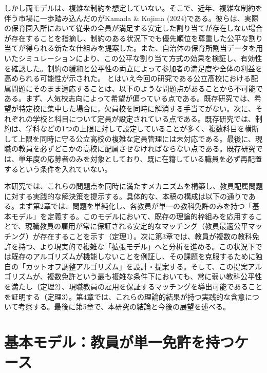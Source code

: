 \documentclass[12pt, a4paper]{article}
\theoremstyle{definition}
\theoremstyle{remark}
\theoremstyle{plain}
\begin{document}
しかし両モデルは、複雑な制約を想定していない。そこで、近年、複雑な制約を伴う市場に一歩踏み込んだのがKamada $\&$ Kojima (2024)である。彼らは、実際の保育園入所において従来の全員が満足する安定した割り当てが存在しない場合が存在することを指摘し、制約のある状況下でも優先順位を尊重した公平な割り当てが得られる新たな仕組みを提案した。また、自治体の保育所割当データを用いたシミュレーションにより、この公平な割り当て方式の効果を検証し、有効性を確認した。制約の緩和と公平性の両立によって参加者の満足度や全体の利益を高められる可能性が示された。
とはいえ今回の研究である公立高校における配属問題にそのまま適応することは、以下のような問題点があることから不可能である。まず、人気校志向によって希望が偏っている点である。既存研究では、希望が特定校に集中した場合に，欠員校を同時に解消する手当てがない。次に、それぞれの学校と科目について定員が設定されている点である。既存研究では、制約は、学科などの1つの上限に対して設定していることが多く、複数科目を横断して上限を同時に守る公立高校の複雑な定員管理には未対応である。最後に、現職の教員を必ずどこかの高校に配属させなければならない点である。既存研究では、単年度の応募者のみを対象としており、既に在籍している職員を必ず再配置するという条件を入れていない。

本研究では、これらの問題点を同時に満たすメカニズムを構築し、教員配属問題に対する実践的な解決策を提示する。具体的な、本稿の構成は以下の通りである。まず第2章では、問題を単純化し、各教員が単一の教科免許のみを持つ「基本モデル」を定義する。このモデルにおいて、既存の理論的枠組みを応用することで、現職教員の雇用が常に保証される安定的なマッチング（教員最適公平マッチング）が存在することを示す（定理1）。次に第3章では、教員が複数の教科免許を持つ、より現実的で複雑な「拡張モデル」へと分析を進める。この状況下では既存のアルゴリズムが機能しないことを例証し、その課題を克服するために独自の「カットオフ調整アルゴリズム」を設計・提案する。そして、この提案アルゴリズムが、複数免許という最も複雑な条件下においても、常に弱い教科公平性を満たし（定理2）、現職教員の雇用を保証するマッチングを導出可能であることを証明する（定理3）。第4章では、これらの理論的結果が持つ実践的な含意について考察する。最後に第5章で、本研究の結論と今後の展望を述べる。



\section{基本モデル：教員が単一免許を持つケース}
\end{document}
